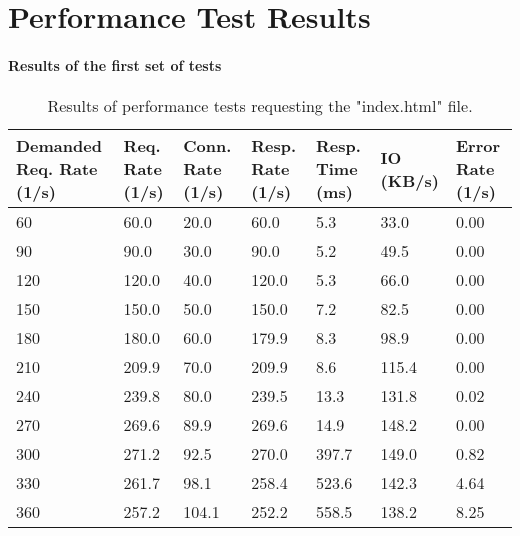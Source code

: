 \chapter{Performance Test Results}

\subsubsection{Results of the first set of tests}

\begin{table}[H]
  \centering
    \begin{tabular}{|m{2.5cm}|m{2cm}|m{2cm}|m{2cm}|m{2cm}|m{2cm}|m{2cm}|}
    \hline
    \textbf{Demanded Req. Rate} (1/s) & \textbf{Req. Rate} (1/s) & \textbf{Conn. Rate} (1/s) & \textbf{Resp. Rate} (1/s) & \textbf{Resp. Time} (ms) & \textbf{IO} (KB/s) & \textbf{Error Rate} (1/s) \\
    \hline
    60 & 60.0 & 20.0 & 60.0 & 5.3 & 33.0 & 0.00 \\
    90 & 90.0 & 30.0 & 90.0 & 5.2 & 49.5 & 0.00 \\
    120 & 120.0 & 40.0 & 120.0 & 5.3 & 66.0 & 0.00 \\
    150 & 150.0 & 50.0 & 150.0 & 7.2 & 82.5 & 0.00 \\
    180 & 180.0 & 60.0 & 179.9 & 8.3 & 98.9 & 0.00 \\
    210 & 209.9 & 70.0 & 209.9 & 8.6 & 115.4 & 0.00 \\
    240 & 239.8 & 80.0 & 239.5 & 13.3 & 131.8 & 0.02 \\
    270 & 269.6 & 89.9 & 269.6 & 14.9 & 148.2 & 0.00 \\
    300 & 271.2 & 92.5 & 270.0 & 397.7 & 149.0 & 0.82 \\
    330 & 261.7 & 98.1 & 258.4 & 523.6 & 142.3 & 4.64 \\
    360 & 257.2 & 104.1 & 252.2 & 558.5 & 138.2 & 8.25 \\
    \hline
    \end{tabular}
  \caption{Results of performance tests requesting the "index.html" file.}
  \label{tab:perf-res-index}
\end{table}
\hspace{2cm}

